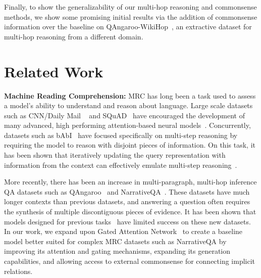 \documentclass[11pt,a4paper]{article}
\begin{document}
Finally, to show the generalizability of our multi-hop reasoning and commonsense methods, we show some promising initial results via the addition of commonsense information over the baseline on QAngaroo-WikiHop~\cite{welbl2017constructing}, an extractive dataset for multi-hop reasoning from a different domain.


 
\section{Related Work}
\label{sec:related}

\noindent\textbf{Machine Reading Comprehension:}
MRC has long been a task used to assess a model's ability to understand and reason about language.
Large scale datasets such as CNN/Daily Mail ~\cite{cnndm} and SQuAD~\cite{rajpurkar2016squad} have encouraged the development of many advanced, high performing attention-based neural models~\cite{seo2016bidirectional,dhingra2016gated}.
Concurrently, datasets such as bAbI~\cite{Babi} have focused specifically on multi-step reasoning by requiring the model to reason with disjoint pieces of information.
On this task, it has been shown that iteratively updating the query representation with information from the context can effectively emulate multi-step reasoning~\cite{sukhbaatar2015end}. 


More recently, there has been an increase in multi-paragraph, multi-hop inference QA datasets such as QAngaroo~\cite{welbl2017constructing} and NarrativeQA~\cite{kovcisky2017narrativeqa}.
These datasets have much longer contexts than previous datasets, and answering a question often requires the synthesis of multiple discontiguous pieces of evidence.
It has been shown that models designed for previous tasks~\cite{seo2016bidirectional,kadlec2016text} have limited success on these new datasets.
In our work, we expand upon Gated Attention Network~\cite{dhingra2016gated} to create a baseline model better suited for complex MRC datasets such as NarrativeQA by improving its attention and gating mechanisms, expanding its generation capabilities, and allowing access to external commonsense for connecting implicit relations.
\end{document}
